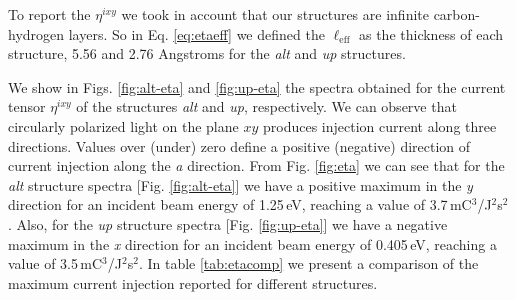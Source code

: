 \documentclass[aps,pra,11pt,tightenlines,showpacs,superscriptaddress,groupedaddress]{revtex4-1}
\newcommand{\ea}{$\eta^{ixy}$}
\begin{document}
To report the {\ea} we took in account that our structures are infinite carbon-hydrogen layers. So in Eq. \ref{eq:etaeff} we defined the $\ell_{\text{eff}}$ as the thickness of each structure, 5.56 and 2.76 Angstroms for the \emph{alt} and \emph{up} structures.

We show in Figs. \ref{fig:alt-eta} and \ref{fig:up-eta}  the spectra obtained for the current tensor {\ea} of the structures \emph{alt} and \emph{up}, respectively. We can observe that circularly polarized light on the plane $xy$ produces injection current along three directions. Values over (under) zero define a positive (negative) direction of current injection along the \emph{a} direction. From Fig. \ref{fig:eta} we can see that for the \emph{alt} structure spectra [Fig. \ref{fig:alt-eta}] we have a positive maximum in the \emph{y} direction for an incident beam energy of 1.25\,eV, reaching a value of 3.7\,mC$^{3}$/J$^{2}$s$^{2}$ . Also, for the \emph{up} structure spectra [Fig. \ref{fig:up-eta}] we have a negative maximum in the \emph{x} direction for an incident beam energy of 0.405\,eV, reaching a value of 3.5\,mC$^{3}$/J$^{2}$s$^{2}$. In table \ref{tab:etacomp} we present a comparison of the maximum current injection reported for different structures.
\end{document}

